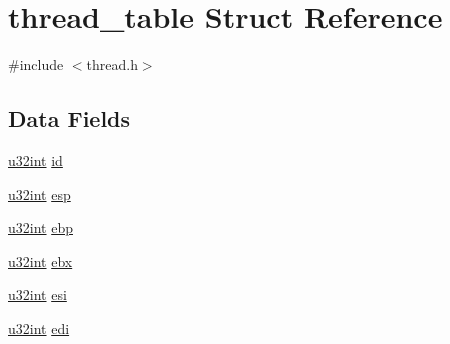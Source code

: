 \hypertarget{structthread__table}{
\section{thread\_\-table Struct Reference}
\label{structthread__table}
}


{\ttfamily \#include $<$thread.h$>$}

\subsection*{Data Fields}
\begin{DoxyCompactItemize}
\item 
\hyperlink{library_8h_ad7ecf93b77285d9bf039d27fa3f1a588}{u32int} \hyperlink{structthread__table_a5b065679595c5c6c708349d563e35b6c}{id}
\item 
\hyperlink{library_8h_ad7ecf93b77285d9bf039d27fa3f1a588}{u32int} \hyperlink{structthread__table_a7c8cdb0e23278dc958565ee9a5ebb14b}{esp}
\item 
\hyperlink{library_8h_ad7ecf93b77285d9bf039d27fa3f1a588}{u32int} \hyperlink{structthread__table_a98b65807686fee47d4061d2f2ea8578a}{ebp}
\item 
\hyperlink{library_8h_ad7ecf93b77285d9bf039d27fa3f1a588}{u32int} \hyperlink{structthread__table_aab632bcfbdfeee937cc42940432af39a}{ebx}
\item 
\hyperlink{library_8h_ad7ecf93b77285d9bf039d27fa3f1a588}{u32int} \hyperlink{structthread__table_a031d176a324992b1ef7c3b7335383590}{esi}
\item 
\hyperlink{library_8h_ad7ecf93b77285d9bf039d27fa3f1a588}{u32int} \hyperlink{structthread__table_ab42cc86f60a286d9cb20116b853239ff}{edi}
\end{DoxyCompactItemize}


